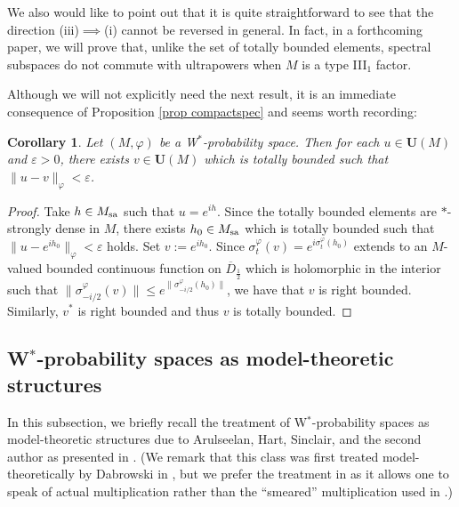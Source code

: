 \documentclass[12pt]{amsart}
\newtheorem{cor}[thm]{Corollary}
\theoremstyle{definition}
\newcommand{\ep}{\varepsilon}
\begin{document}
We also would like to point out that it is quite straightforward to see that the direction (iii)$\implies$(i) cannot be reversed in general.  In fact, in a forthcoming paper, we will prove that, unlike the set of totally bounded elements, spectral subspaces do not commute with ultrapowers when \(M\) is a type III\(_1\) factor.

Although we will not explicitly need the next result, it is an immediate consequence of Proposition \ref{prop compactspec} and seems worth recording:

\begin{cor}\label{unitaryperturbtotallybounded}
    Let $(M,\varphi)$ be a W$^*$-probability space. Then for each $u\in \mathbf{U}(M)$ and $\varepsilon>0$, there exists $v\in \mathbf{U}(M)$ which is totally bounded such that $\|u-v\|_{\varphi}<\ep$.  
\end{cor}
\begin{proof}
    Take $h\in M_{{\rm sa}}$ such that $u=e^{ih}$. Since the totally bounded elements are $*$-strongly dense in $M$, there exists $h_0\in M_{\rm sa}$ which is totally bounded such that $\|u-e^{ih_0}\|_{\varphi}<\ep$ holds.  Set $v:=e^{ih_0}$. 
    Since $\sigma_t^{\varphi}(v)=e^{i\sigma_t^{\varphi}(h_0)}$ extends to an $M$-valued bounded continuous function on $\overline{D}_{\frac12}$ which is holomorphic in the interior such that $\|\sigma_{-i/2}^{\varphi}(v)\|\le e^{\|\sigma_{-i/2}^{\varphi}(h_0)\|}$, we have that $v$ is right bounded. Similarly, $v^*$ is right bounded and thus $v$ is totally bounded.  
\end{proof}


\subsection{W$^*$-probability spaces as model-theoretic structures}\label{modeltheorypresentation}

In this subsection, we briefly recall the treatment of W$^*$-probability spaces as model-theoretic structures due to Arulseelan, Hart, Sinclair, and the second author as presented in \cite{AGHS25}.  (We remark that this class was first treated model-theoretically by Dabrowski in \cite{dabrowski2019continuous}, but we prefer the treatment in \cite{AGHS25} as it allows one to speak of actual multiplication rather than the ``smeared'' multiplication used in \cite{dabrowski2019continuous}.)
\end{document}
